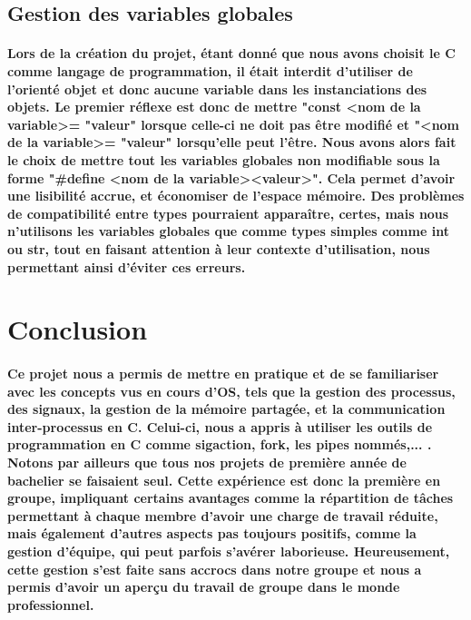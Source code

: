 \documentclass[utf8]{article}
\begin{document}
\subsection{Gestion des variables globales}
\paragraph{Lors de la création du projet, étant donné que nous avons choisit le C comme langage de programmation, il était interdit 
d'utiliser de l'orienté objet et donc aucune variable dans les instanciations des objets. Le premier réflexe est donc de mettre
"const \textless nom de la variable\textgreater  = "valeur" lorsque celle-ci ne doit pas être modifié et "\textless nom de la variable\textgreater = "valeur" lorsqu'elle 
peut l'être. Nous avons alors fait le choix de mettre tout les variables globales non modifiable sous la forme 
"\#define \textless nom de la variable\textgreater \textless valeur\textgreater". Cela permet d'avoir une lisibilité accrue, et économiser de l'espace mémoire. Des
problèmes de compatibilité entre types pourraient apparaître, certes, mais nous n'utilisons les variables globales que comme types simples comme int ou str, tout en
faisant attention à leur contexte d'utilisation, nous permettant ainsi d'éviter ces erreurs.}

\section{Conclusion}
\paragraph{Ce projet nous a permis de mettre en pratique et de se familiariser avec les concepts vus en cours d'OS,
tels que la gestion des processus, des signaux, la gestion de la mémoire partagée, et la communication inter-processus en C.
Celui-ci, nous a appris à utiliser les outils de programmation en C comme sigaction, fork, les pipes nommés,... .
Notons par ailleurs que tous nos projets de première année de bachelier se faisaient seul. Cette expérience est donc
la première en groupe, impliquant certains avantages comme la répartition de tâches permettant à chaque membre d'avoir 
une charge de travail réduite, mais également d'autres aspects pas toujours positifs, comme la gestion d'équipe, qui peut 
parfois s'avérer laborieuse. Heureusement, cette gestion s'est faite sans accrocs dans notre groupe et nous a permis d'avoir
un aperçu du travail de groupe dans le monde professionnel.
}
\end{document}
